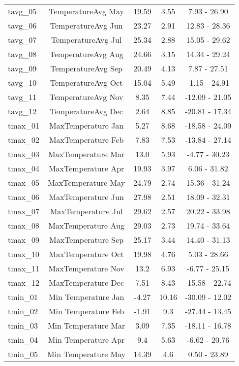 \documentclass[AutoFakeBold]{LZUThesis-PgD&PhD}
\begin{document}
\begin{longtable}[H]{lcccc}
	   tavg\_05 & TemperatureAvg May & 19.59 & 3.55 & 7.93 - 26.90 \\
	   tavg\_06 & TemperatureAvg Jun & 23.27 & 2.91 & 12.83 - 28.36 \\
	   tavg\_07 & TemperatureAvg Jul & 25.34 & 2.88 & 15.05 - 29.62 \\
	   tavg\_08 & TemperatureAvg Aug & 24.66 & 3.15 & 14.34 - 29.24 \\
	   tavg\_09 & TemperatureAvg Sep & 20.49 & 4.13 & 7.87 - 27.51 \\
	   tavg\_10 & TemperatureAvg Oct & 15.04 & 5.49 & -1.15 - 24.91 \\
	   tavg\_11 & TemperatureAvg Nov & 8.35 & 7.44 & -12.09 - 21.05 \\
	   tavg\_12 & TemperatureAvg Dec & 2.64 & 8.85 & -20.81 - 17.34 \\
	   tmax\_01 & MaxTemperature Jan & 5.27 & 8.68 & -18.58 - 24.09 \\
	   tmax\_02 & MaxTemperature Feb & 7.83 & 7.53 & -13.84 - 27.14 \\
	   tmax\_03 & MaxTemperature Mar & 13.0 & 5.93 & -4.77 - 30.23 \\
	   tmax\_04 & MaxTemperature Apr & 19.93 & 3.97 & 6.06 - 31.82 \\
	   tmax\_05 & MaxTemperature May & 24.79 & 2.74 & 15.36 - 31.24 \\
	   tmax\_06 & MaxTemperature Jun & 27.98 & 2.51 & 18.09 - 32.31 \\
	   tmax\_07 & MaxTemperature Jul & 29.62 & 2.57 & 20.22 - 33.98 \\
	   tmax\_08 & MaxTemperature Aug & 29.03 & 2.73 & 19.74 - 33.64 \\
	   tmax\_09 & MaxTemperature Sep & 25.17 & 3.44 & 14.40 - 31.13 \\
	   tmax\_10 & MaxTemperature Oct & 19.98 & 4.76 & 5.03 - 28.66 \\
	   tmax\_11 & MaxTemperature Nov & 13.2 & 6.93 & -6.77 - 25.15 \\
	   tmax\_12 & MaxTemperature Dec & 7.51 & 8.43 & -15.58 - 22.74 \\
	   tmin\_01 & Min Temperature Jan & -4.27 & 10.16 & -30.09 - 12.02 \\
	   tmin\_02 & Min Temperature Feb & -1.91 & 9.3 & -27.44 - 13.45 \\
	   tmin\_03 & Min Temperature Mar & 3.09 & 7.35 & -18.11 - 16.78 \\
	   tmin\_04 & Min Temperature Apr & 9.4 & 5.63 & -6.62 - 20.76 \\
	   tmin\_05 & Min Temperature May & 14.39 & 4.6 & 0.50 - 23.89 \\

\end{longtable}
\end{document}
